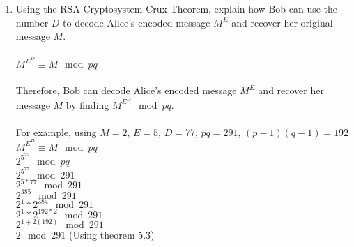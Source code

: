 \documentclass[]{article}
\begin{document}
\begin{enumerate}
\begin{enumerate}
            \item Using the RSA Cryptosystem Crux Theorem, explain how Bob can use the number $D$ to decode Alice’s encoded message $M^E$ and recover her original message $M$.
            \\\\$M^{E^D} \equiv M \mod pq$
            \\\\Therefore, Bob can decode Alice's encoded message $M^E$ and recover her message $M$ by finding $M^{E^D} \mod pq$.
            \\\\For example, using $M=2$, $E=5$, $D=77$, $pq=291$, $(p-1)(q-1)=192$
            \\$M^{E^D} \equiv M \mod pq$
            \\$2^{5^{77}} \mod pq$
            \\$2^{5^{77}} \mod 291$
            \\$2^{5*77} \mod 291$
            \\$2^{385} \mod 291$
            \\$2^{1}*2^{384} \mod 291$
            \\$2^{1}*2^{192*2} \mod 291$
            \\$2^{1+2(192)} \mod 291$
            \\$2 \mod 291$ (Using theorem 5.3)
            
        \end{enumerate}


    
\end{enumerate}
\end{document}
